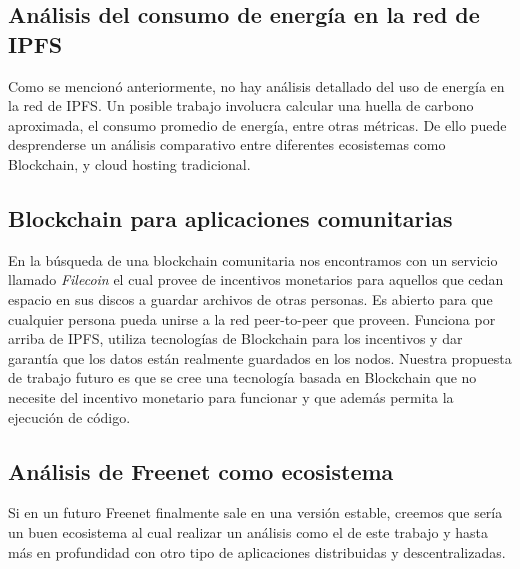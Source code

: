 \subsection{Análisis del consumo de energía en la red de IPFS}

Como se mencionó anteriormente, no hay análisis detallado del uso de energía en la red de IPFS. Un posible trabajo involucra calcular una huella de carbono aproximada, el consumo promedio de energía, entre otras métricas. De ello puede desprenderse un análisis comparativo entre diferentes ecosistemas como Blockchain, y cloud hosting tradicional.

\subsection{Blockchain para aplicaciones comunitarias}

En la búsqueda de una blockchain comunitaria nos encontramos con un servicio llamado \textit{Filecoin} \cite{filecoin} el cual provee de incentivos monetarios para aquellos que cedan espacio en sus discos a guardar archivos de otras personas. Es abierto para que cualquier persona pueda unirse a la red peer-to-peer que proveen. Funciona por arriba de IPFS, utiliza tecnologías de Blockchain para los incentivos y dar garantía que los datos están realmente guardados en los nodos. Nuestra propuesta de trabajo futuro es que se cree una tecnología basada en Blockchain que no necesite del incentivo monetario para funcionar y que además permita la ejecución de código.

\subsection{Análisis de Freenet como ecosistema}

Si en un futuro Freenet finalmente sale en una versión estable, creemos que sería un buen ecosistema al cual realizar un análisis como el de este trabajo y hasta más en profundidad con otro tipo de aplicaciones distribuidas y descentralizadas.
